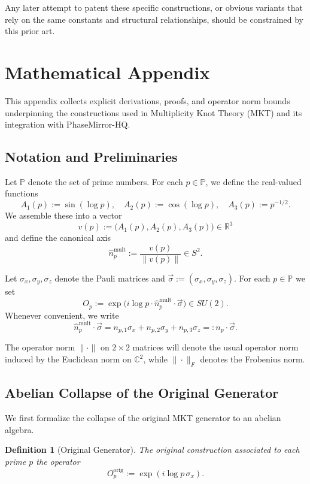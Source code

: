 \documentclass[11pt]{article}
\newtheorem{definition}[theorem]{Definition}
\theoremstyle{remark}
\begin{document}
Any later attempt to patent these specific constructions, or obvious variants
that rely on the same constants and structural relationships, should be
constrained by this prior art.

\appendix
\section{Mathematical Appendix}
\label{app:math}

This appendix collects explicit derivations, proofs, and operator norm bounds
underpinning the constructions used in Multiplicity Knot Theory (MKT) and its
integration with PhaseMirror-HQ.

\subsection{Notation and Preliminaries}

Let $\mathbb{P}$ denote the set of prime numbers. For each $p\in\mathbb{P}$,
we define the real-valued functions
\[
  A_1(p) := \sin(\log p),\quad
  A_2(p) := \cos(\log p),\quad
  A_3(p) := p^{-1/2}.
\]
We assemble these into a vector
\[
  v(p) := \bigl(A_1(p), A_2(p), A_3(p)\bigr) \in \mathbb{R}^3
\]
and define the canonical axis
\[
  \hat{n}_p^{\text{mult}} :=
  \frac{v(p)}{\|v(p)\|} \in S^2.
\]

Let $\sigma_x, \sigma_y, \sigma_z$ denote the Pauli matrices and
$\vec{\sigma} := (\sigma_x,\sigma_y,\sigma_z)$. For each $p\in\mathbb{P}$ we
set
\begin{equation}
  O_p := \exp\!\bigl(i \log p \cdot 
    \hat{n}_p^{\text{mult}} \cdot \vec{\sigma}\bigr)
    \in SU(2).
  \label{eq:Op-def}
\end{equation}
Whenever convenient, we write
\[
  \hat{n}_p^{\text{mult}} \cdot \vec{\sigma}
  = n_{p,1}\sigma_x + n_{p,2}\sigma_y + n_{p,3}\sigma_z
  =: n_p \cdot \vec{\sigma}.
\]

The operator norm $\|\cdot\|$ on $2\times 2$ matrices will denote the usual
operator norm induced by the Euclidean norm on $\mathbb{C}^2$, while
$\|\cdot\|_F$ denotes the Frobenius norm.

\subsection{Abelian Collapse of the Original Generator}

We first formalize the collapse of the original MKT generator to an abelian
algebra.

\begin{definition}[Original Generator]
The original construction associated to each prime $p$ the operator
\[
  O_p^{\text{orig}} := \exp(i \log p\,\sigma_x).
\]
\end{definition}
\end{document}
